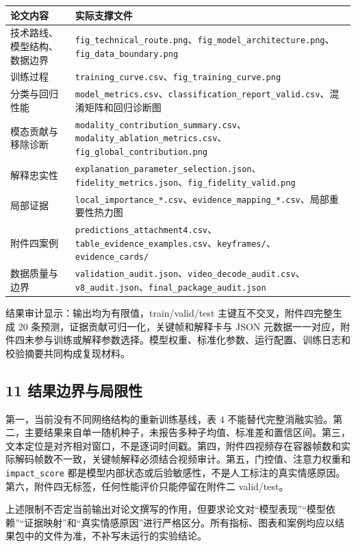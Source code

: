 \documentclass[
  12pt,
  a4paper,
]{ctexart}
\begin{document}
{\small
\begin{longtable}[]{@{}
  >{\raggedright\arraybackslash}p{}
  >{\raggedright\arraybackslash}p{}@{}}
\toprule
论文内容 & 实际支撑文件 \\
\midrule
\endhead
技术路线、模型结构、数据边界 &
\texttt{fig\_technical\_route.png}、\texttt{fig\_model\_architecture.png}、\texttt{fig\_data\_boundary.png} \\
训练过程 &
\texttt{training\_curve.csv}、\texttt{fig\_training\_curve.png} \\
分类与回归性能 &
\texttt{model\_metrics.csv}、\texttt{classification\_report\_valid.csv}、混淆矩阵和回归诊断图 \\
模态贡献与移除诊断 &
\texttt{modality\_contribution\_summary.csv}、\texttt{modality\_ablation\_metrics.csv}、\texttt{fig\_global\_contribution.png} \\
解释忠实性 &
\texttt{explanation\_parameter\_selection.json}、\texttt{fidelity\_metrics.json}、\texttt{fig\_fidelity\_valid.png} \\
局部证据 &
\texttt{local\_importance\_*.csv}、\texttt{evidence\_mapping\_*.csv}、局部重要性热力图 \\
附件四案例 &
\texttt{predictions\_attachment4.csv}、\texttt{table\_evidence\_examples.csv}、\texttt{keyframes/}、\texttt{evidence\_cards/} \\
数据质量与边界 &
\texttt{validation\_audit.json}、\texttt{video\_decode\_audit.csv}、\texttt{v8\_audit.json}、\texttt{final\_package\_audit.json} \\
\bottomrule
\end{longtable}
}

结果审计显示：输出均为有限值，train/valid/test
主键互不交叉，附件四完整生成 20
条预测，证据贡献可归一化，关键帧和解释卡与 JSON
元数据一一对应，附件四未参与训练或解释参数选择。模型权重、标准化参数、运行配置、训练日志和校验摘要共同构成复现材料。

\hypertarget{ux7ed3ux679cux8fb9ux754cux4e0eux5c40ux9650ux6027}{%
\subsection{11
结果边界与局限性}\label{ux7ed3ux679cux8fb9ux754cux4e0eux5c40ux9650ux6027}}

第一，当前没有不同网络结构的重新训练基线，表 4
不能替代完整消融实验。第二，主要结果来自单一随机种子，未报告多种子均值、标准差和置信区间。第三，文本定位是对齐相对窗口，不是逐词时间戳。第四，附件四视频存在容器帧数和实际解码帧数不一致，关键帧解释必须结合视频审计。第五，门控值、注意力权重和
\texttt{impact\_score}
都是模型内部状态或后验敏感性，不是人工标注的真实情感原因。第六，附件四无标签，任何性能评价只能停留在附件二
valid/test。

上述限制不否定当前输出对论文撰写的作用，但要求论文对``模型表现''``模型依赖''``证据映射''和``真实情感原因''进行严格区分。所有指标、图表和案例均应以结果包中的文件为准，不补写未运行的实验结论。
\end{document}

